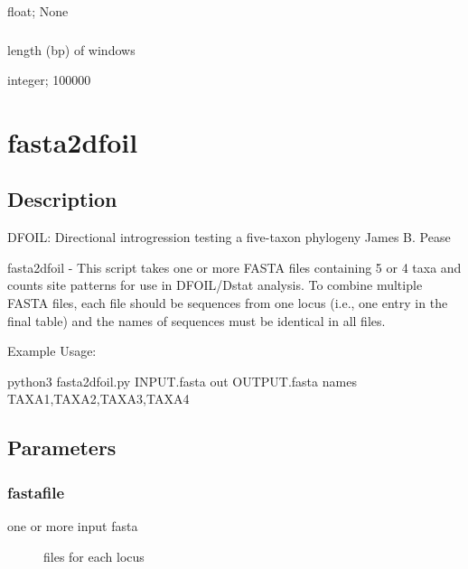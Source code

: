 \documentclass[letterpaper,12pt,english]{sphinxmanual}
\begin{document}
 float;  None


\subsubsection{}
\label{\detokenize{prog_desc:window}}
 length (bp) of windows

 integer;  100000


\section{fasta2dfoil}
\label{\detokenize{prog_desc:fasta2dfoil}}

\subsection{Description}
\label{\detokenize{prog_desc:id7}}
DFOIL: Directional introgression testing a five-taxon phylogeny
James B. Pease

fasta2dfoil -
This script takes one or more FASTA files containing
5 or 4 taxa and counts site patterns for use in DFOIL/Dstat analysis.
To combine multiple FASTA files, each file should be sequences
from one locus (i.e., one entry in the final table) and
the names of sequences must be identical in all files.

Example Usage:

python3 fasta2dfoil.py INPUT.fasta \textendash{}out OUTPUT.fasta         \textendash{}names TAXA1,TAXA2,TAXA3,TAXA4


\subsection{Parameters}
\label{\detokenize{prog_desc:id8}}

\subsubsection{fastafile}
\label{\detokenize{prog_desc:fastafile}}\begin{description}
\item[{ one or more input fasta}] \leavevmode
files for each locus

\end{description}
\end{document}
